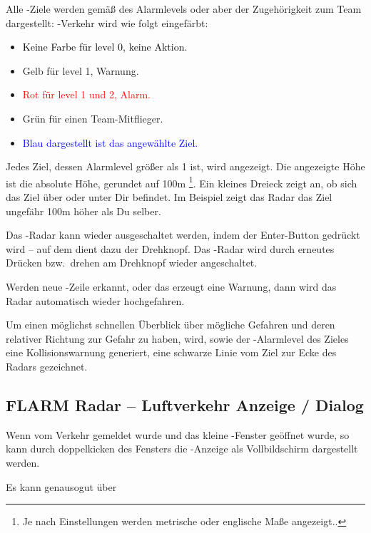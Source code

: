 
Alle \fl-Ziele werden gemäß des Alarmlevels  oder aber der Zugehörigkeit zum Team dargestellt:
\fl-Verkehr wird wie folgt eingefärbt:
\begin{itemize}
\item \textcolor{black} {Keine Farbe für level 0, keine Aktion.}
\item \textcolor{warning} { Gelb für level 1, Warnung.}
\item \textcolor{red} {Rot für level 1 und 2, Alarm.}
\item \textcolor{teammate} {Grün für einen Team-Mitflieger.}
\item \textcolor{blue} {Blau dargestellt ist das angewählte Ziel.}
\end{itemize}


Jedes Ziel, dessen Alarmlevel größer als 1 ist, wird angezeigt.
Die angezeigte Höhe ist die absolute Höhe, gerundet auf 100m
\footnote{Je nach Einstellungen werden metrische oder englische Maße angezeigt..}.
Ein kleines Dreieck zeigt an, ob sich das Ziel über oder unter Dir befindet.
Im Beispiel zeigt das Radar das Ziel ungefähr 100m höher als Du selber.


Das \fl-Radar kann wieder ausgeschaltet werden, indem der Enter-Button gedrückt
wird -- auf dem \al  dient dazu der Drehknopf. Das \fl-Radar wird durch erneutes
Drücken bzw.\ drehen am Drehknopf wieder angeschaltet.

Werden neue \fl-Zeile erkannt, oder das \fl erzeugt eine Warnung, dann wird das
Radar automatisch wieder hochgefahren.

Um einen möglichst schnellen Überblick über mögliche Gefahren und deren
relativer Richtung zur Gefahr zu haben, wird, sowie der \fl-Alarmlevel des Zieles
eine Kollisionswarnung generiert, eine schwarze Linie vom Ziel zur Ecke des
Radars gezeichnet.


\subsection*{FLARM Radar -- Luftverkehr Anzeige / Dialog}
Wenn vom \fl Verkehr gemeldet wurde und das kleine \fl-Fenster geöffnet wurde,  so
kann durch doppelkicken des Fensters die \fl-Anzeige als Vollbildschirm dargestellt werden.

Es kann genausogut über

\begin{quote}
\blink{}
\end{quote}

